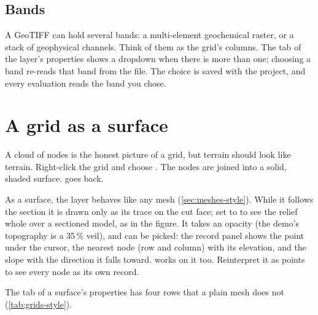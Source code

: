 \subsection{Bands}

A GeoTIFF can hold several bands: a multi-element geochemical raster, or a stack of geophysical channels. Think of them as the grid's columns. The  tab of the layer's properties shows a  dropdown when there is more than one; choosing a band re-reads that band from the file. The choice is saved with the project, and every evaluation reads the band you chose.

\section{A grid as a surface}\label{sec:grids-surface}

A cloud of nodes is the honest picture of a grid, but terrain should look like terrain. Right-click the grid and choose . The nodes are joined into a solid, shaded surface.  goes back.


As a surface, the layer behaves like any mesh (\cref{sec:meshes-style}). While it follows the section it is drawn only as its trace on the cut face; set  to  to see the relief whole over a sectioned model, as in the figure. It takes an opacity (the demo's topography is a 35\,\% veil), and can be picked: the record panel shows the point under the cursor, the nearest node (row and column) with its elevation, and the slope with the direction it falls toward.  works on it too. Reinterpret it as points to see every node as its own record.

The  tab of a surface's properties has four rows that a plain mesh does not (\cref{tab:grids-style}).

